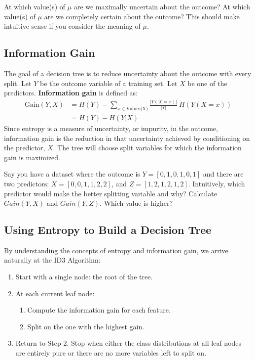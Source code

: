 \begin{question}{}
At which value(s) of $\mu$ are we maximally uncertain about the outcome? At which value(s) of $\mu$ are we completely certain about the outcome? This should make intuitive sense if you consider the meaning of $\mu$. 
\end{question}

\subsection{Information Gain}

The goal of a decision tree is to reduce uncertainty about the outcome with every split. Let $Y$ be the outcome variable of a training set. Let $X$ be one of the predictors. \textbf{Information gain} is defined as:
\begin{align*} \text{Gain}(Y, X) &= H(Y) - \sum_{x \in \text{Values(X)}} \frac{|Y(X=x)|}{|Y|}~ H(Y(X=x)) \\
&= H(Y) - H(Y|X) \end{align*}
Since entropy is a measure of uncertainty, or impurity, in the outcome, information gain is the reduction in that uncertainty achieved by conditioning on the predictor, $X$. The tree will choose split variables for which the information gain is maximized. 
\vspace{5mm}

\begin{question}{}
Say you have a dataset where the outcome is $Y = [0, 1, 0, 1, 0, 1]$ and there are two predictors: $X = [0, 0, 1, 1, 2, 2]$, and $Z = [1, 2, 1, 2, 1, 2]$. Intuitively, which predictor would make the better splitting variable and why? Calculate $Gain(Y, X)$ and $Gain(Y, Z)$. Which value is higher?
\end{question}

\subsection{Using Entropy to Build a Decision Tree}

By understanding the concepts of entropy and information gain, we arrive naturally at the ID3 Algorithm:
\begin{enumerate}
\item Start with a single node: the root of the tree.
\item At each current leaf node:
  \begin{enumerate}
  \item Compute the information gain for each feature.
  \item Split on the one with the highest gain.
  \end{enumerate}
\item Return to Step 2. Stop when either the class distributions at all leaf nodes are entirely pure or there are no more variables left to split on.
\end{enumerate}

